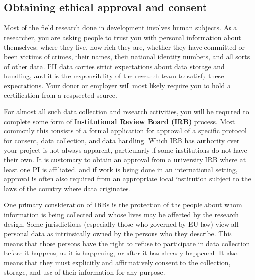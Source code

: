 \subsection{Obtaining ethical approval and consent}

Most of the field research done in development involves human subjects.
As a researcher, you are asking people to trust you with personal information about themselves:
where they live, how rich they are, whether they have committed or been victims of crimes,
their names, their national identity numbers, and all sorts of other data.
PII data carries strict expectations about data storage and handling,
and it is the responsibility of the research team to satisfy these expectations.
Your donor or employer will most likely require you to hold a certification from a respsected source.

For almost all such data collection and research activities,
you will be required to complete some form of \textbf{Institutional Review Board (IRB)} process.
Most commonly this consists of a formal application for approval of a specific
protocol for consent, data collection, and data handling.
Which IRB has authority over your project is not always apparent,
particularly if some institutions do not have their own.
It is customary to obtain an approval from a university IRB
where at least one PI is affiliated,
and if work is being done in an international setting,
approval is often also required
from an appropriate local institution subject to the laws of the country where data originates.

One primary consideration of IRBs
is the protection of the people about whom information is being collected
and whose lives may be affected by the research design.
Some jurisdictions (especially those who governed by EU law) view all personal data
as intrinsically owned by the persons who they describe.
This means that those persons have the right to refuse to participate in data collection
before it happens, as it is happening, or after it has already happened.
It also means that they must explicitly and affirmatively consent
to the collection, storage, and use of their information for any purpose.

